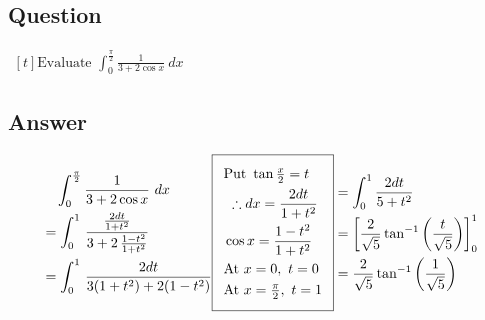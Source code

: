 \documentclass[17pt]{extarticle}
\begin{document}
\noindent
\begin{fleqn} 


\section{Question} 

$\begin{aligned}[t] 
\text{Evaluate \ } \int_{0}^{\frac{\pi}{2}} \frac{1}{3 + 2\cos x}\ dx
\end{aligned}$

\subsection*{Answer}
\begin{equation} \nonumber
\begin{alignedat}{4}
& \quad  \int_{0}^{\frac{\pi}{2}} \frac{1}{3 + 2\cos x}\ dx \\
&= \int_{0}^{1}\,\frac{\frac{2dt}{1+ t^2}}{3 + 2\, \frac{1 - t^2}{1 + t^2}}\\
&= \int_{0}^{1}\,\frac{2dt}{3(1+t^2) + 2(1-t^2)}\\
\end{alignedat}
\begin{alignedat}{4}
    \addtolength{\fboxsep}{5pt}
    \boxed{
     \begin{split}
       & \text{Put } \tan \tfrac{x}{2}=t\\
       & \ \therefore dx =\frac{2dt}{1 + t^2}\\
        & \cos x =  \frac{1 - t^2}{1 + t^2}\\
         & \text{At } x=0,\  t=0\\
         & \text{At } x=\tfrac{\pi}{2},\  t=1\\
        \end{split}
     }\end{alignedat}
\begin{alignedat}{4}
&= \int_{0}^{1}\frac{2dt}{5+t^2}\\
&= \left[\frac{2}{\sqrt{5}}\tan^{-1}\left(\frac{t}{\sqrt{5}}\right)\right]_{0}^{1}\\
&= \frac{2}{\sqrt{5}}\tan^{-1}\left(\frac{1}{\sqrt{5}}\right)\\
\end{alignedat}
\end{equation}


\end{fleqn}
\end{document}
